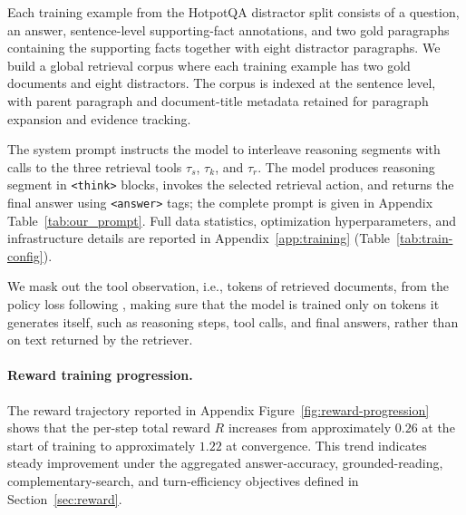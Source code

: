 \documentclass[11pt]{article}
\begin{document}
Each training example from the HotpotQA distractor split consists of a question, an answer, sentence-level supporting-fact annotations, and two gold paragraphs containing the supporting facts together with eight distractor paragraphs. We build a global retrieval corpus where each training example has two gold documents and eight distractors. The corpus is indexed at the sentence level, with parent paragraph and document-title metadata retained for paragraph expansion and evidence tracking.

The system prompt instructs the model to interleave reasoning segments with calls to the three retrieval tools $\tau_s$, $\tau_k$, and $\tau_r$.
The model produces reasoning segment in \texttt{\textless{}think\textgreater{}} blocks, invokes the selected retrieval action, and returns the final answer using \texttt{\textless{}answer\textgreater{}} tags; the complete prompt is given in Appendix Table~\ref{tab:our_prompt}. Full data statistics, optimization hyperparameters, and infrastructure details are reported in Appendix~\ref{app:training} (Table~\ref{tab:train-config}).


We mask out the tool observation, i.e., tokens of retrieved documents, from the policy loss following \citet{jin2025search}, making sure that the model is trained only on tokens it generates itself, such as reasoning steps, tool calls, and final answers, rather than on text returned by the retriever.

\paragraph{Reward training progression.} The reward trajectory reported in Appendix Figure~\ref{fig:reward-progression} shows that the per-step total reward $R$ increases from approximately $0.26$ at the start of training to approximately $1.22$ at convergence. This trend indicates steady improvement under the aggregated answer-accuracy, grounded-reading, complementary-search, and turn-efficiency objectives defined in Section~\ref{sec:reward}.
\end{document}
